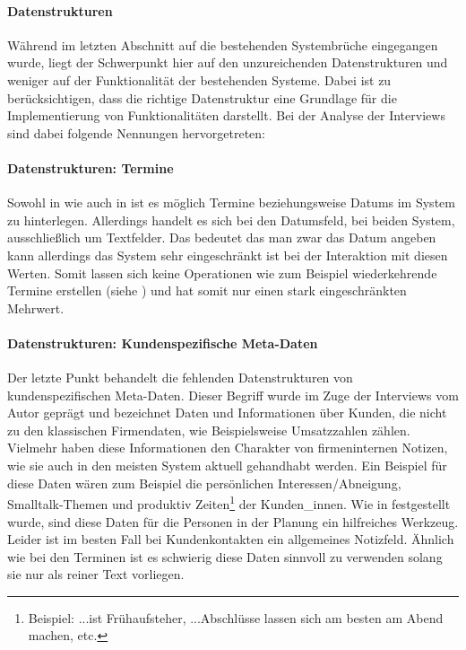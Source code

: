 \documentclass[Bachelorarbeit.tex]{subfiles}
\begin{document}
\paragraph{Datenstrukturen}
\label{interviewsAnalyseDatenstrukturen}
Während im letzten Abschnitt auf die bestehenden Systembrüche eingegangen wurde, liegt der Schwerpunkt hier auf den unzureichenden Datenstrukturen und weniger auf der Funktionalität der bestehenden Systeme. 
Dabei ist zu berücksichtigen, dass die richtige Datenstruktur eine Grundlage für die Implementierung von Funktionalitäten darstellt. 
Bei der Analyse der Interviews sind dabei folgende Nennungen hervorgetreten:

\paragraph{Datenstrukturen: Termine}
Sowohl in  wie auch in  ist es möglich Termine beziehungsweise Datums im System zu hinterlegen. 
Allerdings handelt es sich bei den Datumsfeld, bei beiden System, ausschließlich um Textfelder. 
Das bedeutet das man zwar das Datum angeben kann allerdings das System sehr eingeschränkt ist bei der Interaktion mit diesen Werten. 
Somit lassen sich keine Operationen wie zum Beispiel wiederkehrende Termine erstellen (siehe ) und hat somit nur einen stark eingeschränkten Mehrwert.


\paragraph{Datenstrukturen: Kundenspezifische Meta-Daten}
Der letzte Punkt behandelt die fehlenden Datenstrukturen von kundenspezifischen Meta-Daten.
Dieser Begriff wurde im Zuge der Interviews vom Autor geprägt und bezeichnet Daten und Informationen über Kunden, die nicht zu den klassischen Firmendaten, wie Beispielsweise Umsatzzahlen zählen. 
Vielmehr haben diese Informationen den Charakter von firmeninternen Notizen, wie sie auch in den meisten System aktuell gehandhabt werden.
Ein Beispiel für diese Daten wären zum Beispiel die persönlichen Interessen/Abneigung, Smalltalk-Themen und produktiv Zeiten\footnote{Beispiel: ...ist Frühaufsteher, ...Abschlüsse lassen sich am besten am Abend machen, etc.} der Kunden\_innen. 
Wie in   festgestellt wurde, sind diese Daten für die Personen in der Planung ein hilfreiches Werkzeug. 
Leider ist im besten Fall bei Kundenkontakten ein allgemeines Notizfeld. 
Ähnlich wie bei den Terminen ist es schwierig diese Daten sinnvoll zu verwenden solang sie nur als reiner Text vorliegen.
\end{document}
